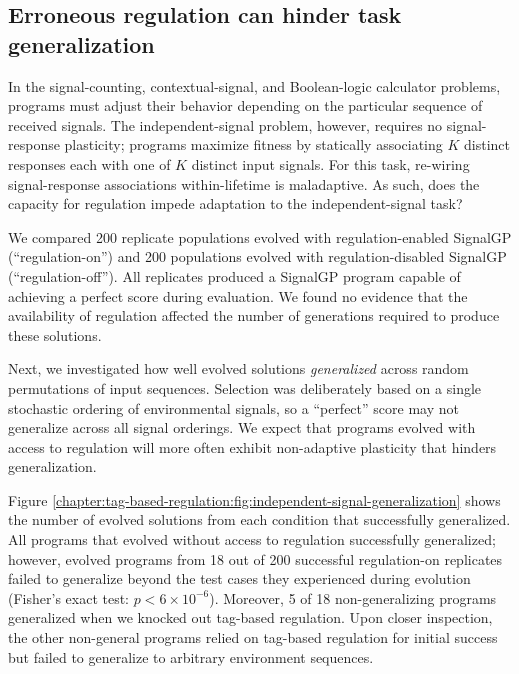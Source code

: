 \subsection{Erroneous regulation can hinder task generalization}



In the signal-counting, contextual-signal, and Boolean-logic calculator problems, programs must adjust their behavior depending on the particular sequence of received signals.
The independent-signal problem, however, requires no signal-response plasticity; programs maximize fitness by statically associating $K$ distinct responses each with one of $K$ distinct input signals.
For this task, re-wiring signal-response associations within-lifetime is maladaptive.
As such, does the capacity for regulation impede adaptation to the independent-signal task?


We compared 200 replicate populations evolved with regulation-enabled SignalGP (``regulation-on'') and 200 populations evolved with regulation-disabled SignalGP (``regulation-off'').
All replicates produced a SignalGP program capable of achieving a perfect score during evaluation. 
We found no evidence that the availability of regulation affected the number of generations required to produce these solutions.


Next, we investigated how well evolved solutions \textit{generalized} across random permutations of input sequences.
Selection was deliberately based on a single stochastic ordering of environmental signals, so a ``perfect'' score may not generalize across all signal orderings.
We expect that programs evolved with access to regulation will more often exhibit non-adaptive plasticity that hinders generalization.

Figure \ref{chapter:tag-based-regulation:fig:independent-signal-generalization} shows the number of evolved solutions from each condition that successfully generalized.
All programs that evolved without access to regulation successfully generalized; however, evolved programs from 18 out of 200 successful regulation-on replicates failed to generalize beyond the test cases they experienced during evolution (Fisher's exact test: $p < 6\times10^{-6}$).
Moreover, 5 of 18 non-generalizing programs generalized when we knocked out tag-based regulation.
Upon closer inspection, the other non-general programs relied on tag-based regulation for initial success but failed to generalize to arbitrary environment sequences.

